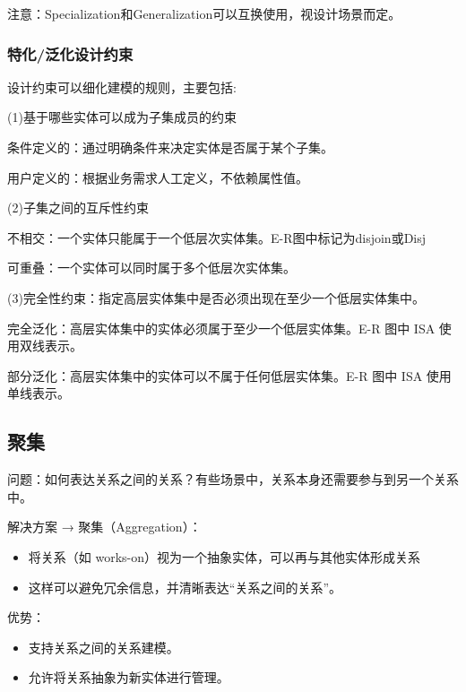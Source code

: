 注意：Specialization和Generalization可以互换使用，视设计场景而定。

\subsubsection{特化/泛化设计约束}

设计约束可以细化建模的规则，主要包括:

(1)基于哪些实体可以成为子集成员的约束

条件定义的：通过明确条件来决定实体是否属于某个子集。

用户定义的：根据业务需求人工定义，不依赖属性值。

(2)子集之间的互斥性约束

不相交：一个实体只能属于一个低层次实体集。E-R图中标记为disjoin或Disj

可重叠：一个实体可以同时属于多个低层次实体集。

(3)完全性约束：指定高层实体集中是否必须出现在至少一个低层实体集中。

完全泛化：高层实体集中的实体必须属于至少一个低层实体集。E-R 图中 ISA 使用双线表示。

部分泛化：高层实体集中的实体可以不属于任何低层实体集。E-R 图中 ISA 使用单线表示。

\subsection{聚集}

问题：如何表达关系之间的关系？有些场景中，关系本身还需要参与到另一个关系中。

解决方案 → 聚集（Aggregation）：
\begin{itemize}
    \item 将关系（如 works-on）视为一个抽象实体，可以再与其他实体形成关系
    \item 这样可以避免冗余信息，并清晰表达“关系之间的关系”。
\end{itemize}

优势：
\begin{itemize}
    \item 支持关系之间的关系建模。
    \item 允许将关系抽象为新实体进行管理。
\end{itemize}



